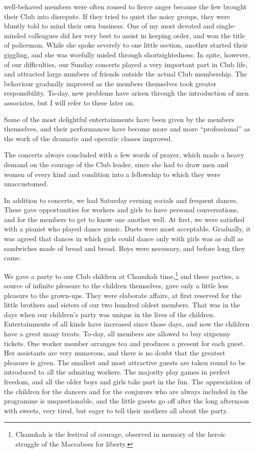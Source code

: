 well-behaved members were often roused to fierce anger
because the few brought their Club into disrepute. If
they tried to quiet the noisy groups, they were bluntly
told to mind their own business. One of my most
devoted and single-minded colleagues did her very best
to assist in keeping order, and won the title of policeman.
While she spoke severely to one little section, another
started their giggling, and she was woefully misled
through shortsightedness. In spite, however, of our
difficulties, our Sunday concerts played a very important part
in Club life, and attracted large numbers of friends
outside the actual Club membership. The behaviour
gradually improved as the members themselves took greater
responsibility. To-day, new problems have arisen through
the introduction of men associates, but I will refer to
these later on.

Some of the most delightful entertainments have been
given by the members themselves, and their performances
have become more and more “professional” as the work
of the dramatic and operatic classes improved.

The concerts always concluded with a few words of
prayer, which made a heavy demand on the courage of
the Club leader, since she had to draw men and women
of every kind and condition into a fellowship to which
they were unaccustomed.

In addition to concerts, we had Saturday evening
socials and frequent dances. These gave opportunities for
workers and girls to have personal conversations, and for
the members to get to know one another well. At first,
we were satisfied with a pianist who played dance music.
Duets were most acceptable. Gradually, it was agreed
that dances in which girls could dance only with girls
was as dull as sandwiches made of bread and bread. Boys
were necessary, and before long they came.

We gave a party to our Club children at Chanukah
time,\footnote{Chanukah is the festival of courage,
observed in memory of the heroic
struggle of the Maccabees for liberty.}
and these parties, a source of infinite pleasure
to the children themselves, gave only a little less
pleasure to the grown-ups. They were elaborate affairs,
at first reserved for the little brothers and sisters of our
two hundred oldest members. That was in the days
when our children’s party was unique in the
lives of the children. Entertainments of all kinds have
increased since those days, and now the children have a
great many treats. To-day, all members are allowed to
buy sixpenny tickets. One worker member arranges tea
and produces a present for each guest. Her assistants are
very numerous, and there is no doubt that the greatest
pleasure is given. The smallest and most attractive guests
are taken round to be introduced to all the admiring
workers. The majority play games in perfect freedom,
and all the older boys and girls take part in the fun. The
appreciation of the children for the dancers and for the
conjurors who are always included in the programme is
unquestionable, and the little guests go off after the long
afternoon with sweets, very tired, but eager to tell their
mothers all about the party.

